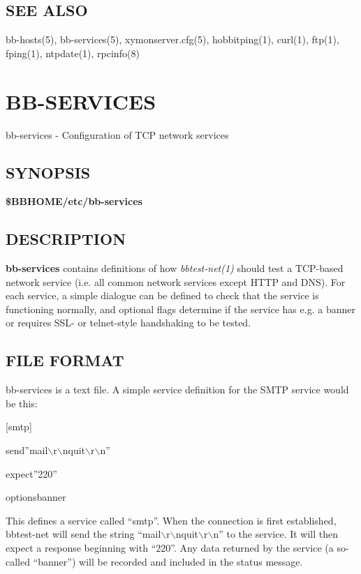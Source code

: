 \subsection{SEE ALSO}
bb-hosts(5), bb-services(5), xymonserver.cfg(5), hobbitping(1), curl(1), ftp(1), fping(1), ntpdate(1), rpcinfo(8) 


%
\newpage
\section{BB-SERVICES}

 bb-services - Configuration of TCP network services 

 
\subsection{SYNOPSIS}
\textbf{\$BBHOME/etc/bb-services}


 
\subsection{DESCRIPTION}
\textbf{bb-services}
 contains definitions of how \emph{bbtest-net(1)}
 should test a TCP-based network service (i.e. all common network services except HTTP and DNS). For each service, a simple dialogue can be defined to check that the service is functioning normally, and optional flags determine if the service has e.g. a banner or requires SSL- or telnet-style handshaking to be tested. 

 
\subsection{FILE FORMAT}
 bb-services is a text file. A simple service definition for the SMTP service would be this:  


  
[smtp]  
 
send''mail$\backslash$r$\backslash$nquit$\backslash$r$\backslash$n''  
 
expect''220''  
 
optionsbanner  



  This defines a service called ``smtp''. When the connection is first established, bbtest-net will send the string ``mail$\backslash$r$\backslash$nquit$\backslash$r$\backslash$n'' to the service. It will then expect a response beginning with ``220''. Any data returned by the service (a so-called ``banner'') will be recorded and included in the status message. 



